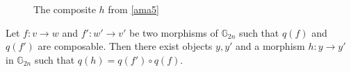 {\begin{figure}[ht]
\begin{eq*}
 \end{eq*}
\caption{The composite $h$ from \cref{ama5} }
\label{composite}
\end{figure}
\clearpage
}

\begin{prop}\label{ama5} Let $f: v \to w$ and $f' : w' \to v'$ be two morphisms of $\mathbb{G}_{2n}$ such that $q(f)$ and $q(f')$ are composable. Then there exist objects $y, y'$ and a morphism $h: y \to y'$ in $\mathbb{G}_{2n}$ such that $q(h) = q(f') \circ q(f)$.
\end{prop}
